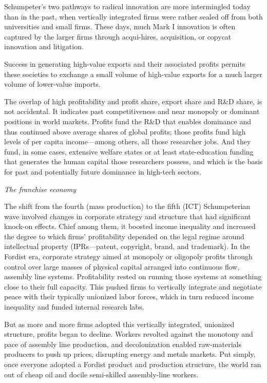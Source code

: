 \documentclass[
]{book}
\begin{document}
Schumpeter's two pathways to radical innovation are more intermingled today than in the past, when vertically integrated firms were rather sealed off from both universities and small firms. These days, much Mark I innovation is often captured by the larger firms through acqui-hires, acquisition, or copycat innovation and litigation.

Success in generating high-value exports and their associated profits permits these societies to exchange a small volume of high-value exports for a much larger volume of lower-value imports.

The overlap of high profitability and profit share, export share and R\&D share, is not accidental. It indicates past competitiveness and near monopoly or dominant positions in world markets. Profits fund the R\&D that enables dominance and thus continued above average shares of global profits; those profits fund high levels of per capita income---among others, all those researcher jobs. And they fund, in some cases, extensive welfare states or at least state-education funding that generates the human capital those researchers possess, and which is the basis for past and potentially future dominance in high-tech sectors.

\emph{The franchise economy}

The shift from the fourth (mass production) to the fifth (ICT) Schumpeterian wave involved changes in corporate strategy and structure that had significant knock-on effects. Chief among them, it boosted income inequality and increased the degree to which firms' profitability depended on the legal regime around intellectual property (IPRs---patent, copyright, brand, and trademark). In the Fordist era, corporate strategy aimed at monopoly or oligopoly profits through control over large masses of physical capital arranged into continuous flow, assembly line systems. Profitability rested on running those systems at something close to their full capacity. This pushed firms to vertically integrate and negotiate peace with their typically unionized labor forces, which in turn reduced income inequality and funded internal research labs.

But as more and more firms adopted this vertically integrated, unionized structure, profits began to decline. Workers revolted against the monotony and pace of assembly line production, and decolonization enabled raw-materials producers to push up prices, disrupting energy and metals markets. Put simply, once everyone adopted a Fordist product and production structure, the world ran out of cheap oil and docile semi-skilled assembly-line workers.
\end{document}
